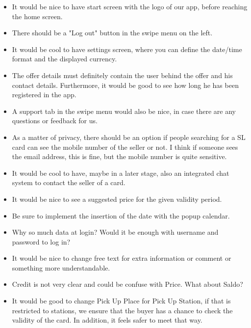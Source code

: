 \documentclass[11pt,twoside,a4paper]{report}
\begin{document}
\begin{itemize}

\item It would be nice to have start screen with the logo of our app, before reaching the home screen.

\item There should be a "Log out" button in the swipe menu on the left.

\item It would be cool to have settings screen, where you can define the date/time format and the displayed currency.

\item The offer details must definitely contain the user behind the offer and his contact details. Furthermore, it would be good to see how long he has been registered in the app.

\item A support tab in the swipe menu would also be nice, in case there are any questions or feedback for us.

\item As a matter of privacy, there should be an option if people searching for a SL card can see the mobile number of the seller or not. I think if someone sees the email address, this is fine, but the mobile number is quite sensitive.

\item It would be cool to have, maybe in a later stage, also an integrated chat system to contact the seller of a card.

\item It would be nice to see a suggested price for the given validity period.

\item Be sure to implement the insertion of the date with the popup calendar.

\item Why so much data at login? Would it be enough with username and password to log in?

\item It would be nice to change free text for extra information or comment or something more understandable.

\item Credit is not very clear and could be confuse with Price. What about Saldo?

\item It would be good to change Pick Up Place for Pick Up Station, if that is restricted to stations, we ensure that the buyer has a chance to check the validity of the card. In addition, it feels safer to meet that way.

\end{itemize}
\end{document}
